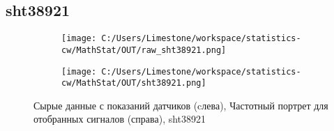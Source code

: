 \documentclass[12pt]{article}%
\begin{document}
%
\subsection{sht38921}%
\label{subsec:sht38921}%


\begin{figure}[h!]%
\begin{subfigure}[b]{0.45\linewidth}%
\texttt{[image: C:/Users/Limestone/workspace/statistics-cw/MathStat/OUT/raw\_sht38921.png]}%
\end{subfigure}%
\begin{subfigure}[b]{0.45\linewidth}%
\texttt{[image: C:/Users/Limestone/workspace/statistics-cw/MathStat/OUT/sht38921.png]}%
\end{subfigure}%
\caption{Сырые данные с показаний датчиков (cлева), Частотный портрет для отобранных сигналов (справа), sht38921}%
\end{figure}

%
\end{document}
